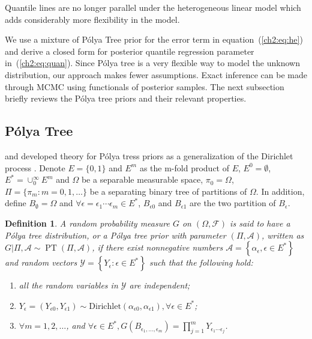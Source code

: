 \documentclass[12pt]{article}
\newtheorem{deff}[thm]{Definition}
\newcommand{\polya}{P\'{o}lya}
\DeclareMathOperator{\pt}{PT}
\begin{document}
Quantile lines are no longer parallel under the heterogeneous linear
model which adds considerably more flexibility in the model.

We use a mixture of \polya{} Tree prior for the error term in equation~(\ref{ch2:eq:he})
 and derive a closed form for posterior quantile
regression parameter in~(\ref{ch2:eq:quan}).  Since \polya{} tree is a
very flexible way to model the unknown distribution, our approach
makes fewer assumptions.  Exact inference can be made through MCMC using
functionals of posterior samples. The next subsection briefly reviews
the \polya{} tree priors and their relevant properties.

\subsection{\polya{} Tree}
\citet{lavine1992, lavine1994} and \citet{mauldin1992} developed
theory for \polya{} tress priors as a generalization of the Dirichlet
process \citep{ferguson1974}. Denote $E=\{0,1\}$ and $E^m$ as the
m-fold product of $E$, $E^0= \emptyset$, $E^{*} = \cup_0^{\infty} E^m$
and $\Omega$ be a separable measurable space, $\pi_0 = \Omega$, $\Pi=
\{ \pi_m: m=0,1, \ldots \} $ be a separating binary tree of partitions
of $\Omega$. In addition, define $B_{\emptyset} = \Omega$ and $\forall
\epsilon=\epsilon_1\cdots \epsilon_m \in E^{*}$, $B_{\epsilon 0}$ and
$B_{\epsilon 1}$ are the two partition of $B_{\epsilon}$.
\begin{deff}
  A random probability measure $G$ on $(\Omega, \mathcal{F})$ is said
  to have a \polya{} tree distribution, or a \polya{} tree prior with
  parameter $(\Pi, \mathcal{A})$, written as $G|\Pi, \mathcal{A} \sim
  \pt (\Pi, \mathcal{A})$, if there exist nonnegative numbers
  $\mathcal{A}= \left\{ \alpha_{\epsilon}, \epsilon \in E^{*}
  \right\}$ and random vectors $\mathcal{Y} = \left\{ Y_{\epsilon} :
    \epsilon \in E^{*} \right\}$ such that the following hold:
  \begin{enumerate}
  \item\label{ch2:item:1} all the random variables in $\mathcal{Y}$ are
    independent;
  \item $Y_{\epsilon}= (Y_{\epsilon 0}, Y_{\epsilon 1}) \sim
    \mathrm{Dirichlet}(\alpha_{\epsilon 0 }, \alpha_{\epsilon 1}),
    \forall \epsilon \in E^{*}$;
  \item $\forall m=1,2, \ldots$, and $\forall \epsilon \in E^{*},
    G(B_{\epsilon_{1}, \ldots, \epsilon_m}) = \prod_{j=1}^m
    Y_{\epsilon_1 \cdots \epsilon_j}$.
  \end{enumerate}
\end{deff}
\end{document}
